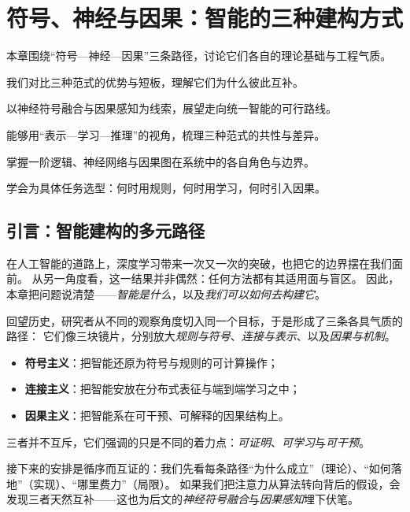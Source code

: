 \chapter{符号、神经与因果：智能的三种建构方式}

\begin{introduction}
  \item 本章围绕“符号—神经—因果”三条路径，讨论它们各自的理论基础与工程气质。
  \item 我们对比三种范式的优势与短板，理解它们为什么彼此互补。
  \item 以神经符号融合与因果感知为线索，展望走向统一智能的可行路线。
\end{introduction}

\begin{introduction}
  \item 能够用“表示—学习—推理”的视角，梳理三种范式的共性与差异。
  \item 掌握一阶逻辑、神经网络与因果图在系统中的各自角色与边界。
  \item 学会为具体任务选型：何时用规则，何时用学习，何时引入因果。
\end{introduction}

\section{引言：智能建构的多元路径}

在人工智能的道路上，深度学习带来一次又一次的突破，也把它的边界摆在我们面前。  
从另一角度看，这一结果并非偶然：任何方法都有其适用面与盲区。  
因此，本章把问题说清楚——\emph{智能是什么}，以及\emph{我们可以如何去构建它}。

回望历史，研究者从不同的观察角度切入同一个目标，于是形成了三条各具气质的路径：  
它们像三块镜片，分别放大\emph{规则与符号}、\emph{连接与表示}、以及\emph{因果与机制}。

\begin{itemize}
\item \textbf{符号主义}：把智能还原为符号与规则的可计算操作；
\item \textbf{连接主义}：把智能安放在分布式表征与端到端学习之中；
\item \textbf{因果主义}：把智能系在可干预、可解释的因果结构上。
\end{itemize}
三者并不互斥，它们强调的只是不同的着力点：\emph{可证明}、\emph{可学习}与\emph{可干预}。

接下来的安排是循序而互证的：我们先看每条路径“为什么成立”（理论）、“如何落地”（实现）、“哪里费力”（局限）。  
如果我们把注意力从算法转向背后的假设，会发现三者天然互补——这也为后文的\emph{神经符号融合}与\emph{因果感知}埋下伏笔。

